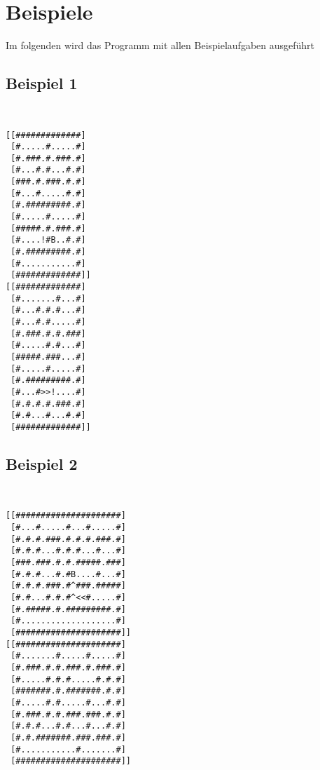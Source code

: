 \documentclass[a4paper,10pt,ngerman]{scrartcl}
\begin{document}
\section{Beispiele}
Im folgenden wird das Programm mit allen Beispielaufgaben ausgeführt

\subsection{Beispiel 1}\mbox{}\\
\begin{lstlisting}[frame=tb]
[[#############]
 [#.....#.....#]
 [#.###.#.###.#]
 [#...#.#...#.#]
 [###.#.###.#.#]
 [#...#.....#.#]
 [#.#########.#]
 [#.....#.....#]
 [#####.#.###.#]
 [#....!#B..#.#]
 [#.#########.#]
 [#...........#]
 [#############]]
[[#############]
 [#.......#...#]
 [#...#.#.#...#]
 [#...#.#.....#]
 [#.###.#.#.###]
 [#.....#.#...#]
 [#####.###...#]
 [#.....#.....#]
 [#.#########.#]
 [#...#>>!....#]
 [#.#.#.#.###.#]
 [#.#...#...#.#]
 [#############]]
\end{lstlisting}

\subsection{Beispiel 2}\mbox{}\\
\begin{lstlisting}[frame=tb]
[[#####################]
 [#...#.....#...#.....#]
 [#.#.#.###.#.#.#.###.#]
 [#.#.#...#.#.#...#...#]
 [###.###.#.#.#####.###]
 [#.#.#...#.#B....#...#]
 [#.#.#.###.#^###.#####]
 [#.#...#.#.#^<<#.....#]
 [#.#####.#.#########.#]
 [#...................#]
 [#####################]]
[[#####################]
 [#.......#.....#.....#]
 [#.###.#.#.###.#.###.#]
 [#.....#.#.#.....#.#.#]
 [#######.#.#######.#.#]
 [#.....#.#.....#...#.#]
 [#.###.#.#.###.###.#.#]
 [#.#.#...#.#...#...#.#]
 [#.#.#######.###.###.#]
 [#...........#.......#]
 [#####################]]
\end{lstlisting}
\end{document}
